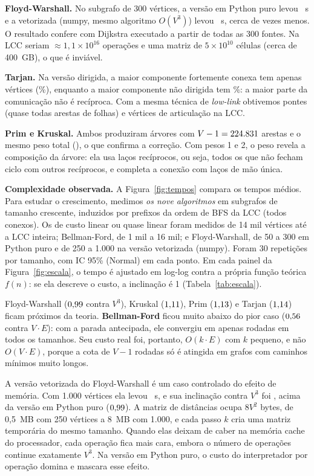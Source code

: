 \documentclass[sigconf]{webmedia}
\begin{document}
\textbf{Floyd-Warshall.} No subgrafo de 300 vértices, a versão em Python puro levou
\tFwPuro~s e a vetorizada (numpy, mesmo algoritmo $O(V^3)$) levou \tFwNumpy~s, cerca de
\razaoFw{} vezes menos. O
resultado confere com Dijkstra executado a partir de todas as 300 fontes. Na LCC seriam
$\approx1{,}1\times10^{16}$ operações e uma matriz de $5\times10^{10}$ células (cerca de
400~GB), o que é inviável.

\textbf{Tarjan.} Na versão dirigida, a maior componente fortemente conexa tem apenas
\maiorScc{} vértices (\pctMaiorScc\%), enquanto a maior componente não dirigida tem \pctVLcc\%: a maior
parte da comunicação não é recíproca. Com a mesma técnica de \emph{low-link} obtivemos
\pontes{} pontes (quase todas arestas de folhas) e \articulacoes{} vértices de articulação na LCC.

\textbf{Prim e Kruskal.} Ambos produziram árvores com $V-1 = 224.831$ arestas e o mesmo
peso total (\pesoMst), o que confirma a correção. Com pesos 1 e 2, o peso revela a
composição da árvore: ela usa \recipNaArvore{} laços recíprocos, ou seja, todos os que
não fecham ciclo com outros recíprocos, e completa a conexão com laços de mão única.
\kruskalVsPrim

\textbf{Complexidade observada.} A Figura~\ref{fig:tempos} compara os tempos médios. Para
estudar o crescimento, medimos \emph{os nove algoritmos} em subgrafos de tamanho
crescente, induzidos por prefixos da ordem de BFS da LCC (todos conexos). Os de custo
linear ou quase linear foram medidos de 14 mil vértices até a LCC inteira; Bellman-Ford,
de 1 mil a 16 mil; e Floyd-Warshall, de 50 a 300 em Python puro e de 250 a 1.000 na
versão vetorizada (numpy). Foram 30 repetições por tamanho, com
IC 95\% (Normal) em cada ponto. Em cada painel da Figura~\ref{fig:escala}, o tempo é
ajustado em log-log contra a própria função teórica $f(n)$: se ela descreve o custo, a
inclinação é 1 (Tabela~\ref{tab:escala}).

Floyd-Warshall ($0{,}99$ contra $V^3$), Kruskal ($1{,}11$), Prim ($1{,}13$) e Tarjan
($1{,}14$) ficam próximos da teoria. \textbf{Bellman-Ford} ficou muito abaixo do pior
caso ($0{,}56$ contra $V\cdot E$): com a parada antecipada, ele convergiu em apenas
\rodadasEscala{} rodadas em todos os tamanhos. Seu custo real foi, portanto, $O(k\cdot E)$
com $k$ pequeno, e não $O(V\cdot E)$, porque a cota de $V-1$ rodadas só é atingida em
grafos com caminhos mínimos muito longos.

A versão vetorizada do Floyd-Warshall é um caso controlado do efeito de memória. Com 1.000
vértices ela levou \tFwNumpyMil~s, e sua inclinação contra $V^3$ foi \textbf{\expFwNumpy},
acima da versão em Python puro ($0{,}99$). A matriz de distâncias ocupa $8V^2$ bytes, de
0,5~MB com 250 vértices a 8~MB com 1.000, e cada passo $k$ cria uma matriz temporária do
mesmo tamanho. Quando elas deixam de caber na memória cache do processador, cada operação
fica mais cara, embora o número de operações continue exatamente $V^3$. Na versão em
Python puro, o custo do interpretador por operação domina e mascara esse efeito.
\end{document}
